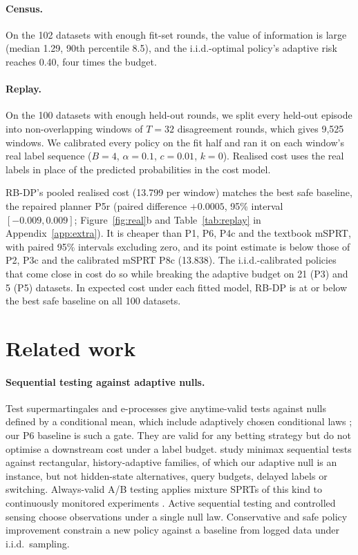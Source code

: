 \documentclass{article}
\theoremstyle{plain}
\theoremstyle{definition}
\theoremstyle{remark}
\begin{document}
\paragraph{Census.} On the 102 datasets with enough fit-set rounds, the value of information is large (median 1.29, 90th percentile 8.5), and the i.i.d.-optimal policy's adaptive risk reaches 0.40, four times the budget.

\paragraph{Replay.} On the 100 datasets with enough held-out rounds, we split every held-out episode into non-overlapping windows of $T=32$ disagreement rounds, which gives 9{,}525 windows. We calibrated every policy on the fit half and ran it on each window's real label sequence ($B=4$, $\alpha=0.1$, $c=0.01$, $k=0$). Realised cost uses the real labels in place of the predicted probabilities in the cost model.


RB-DP's pooled realised cost (13.799 per window) matches the best safe baseline, the repaired planner P5r (paired difference $+0.0005$, 95\% interval $[-0.009,0.009]$; Figure~\ref{fig:real}b and Table~\ref{tab:replay} in Appendix~\ref{app:extra}). It is cheaper than P1, P6, P4c and the textbook mSPRT, with paired 95\% intervals excluding zero, and its point estimate is below those of P2, P3c and the calibrated mSPRT P8c (13.838). The i.i.d.-calibrated policies that come close in cost do so while breaking the adaptive budget on 21 (P3) and 5 (P5) datasets. In expected cost under each fitted model, RB-DP is at or below the best safe baseline on all 100 datasets.


\section{Related work}
\label{sec:related}

\paragraph{Sequential testing against adaptive nulls.} Test supermartingales and e-processes give anytime-valid tests against nulls defined by a conditional mean, which include adaptively chosen conditional laws \citep{ramdas2023gametheoretic,waudbysmith2024betting,howard2021timeuniform,ville1939etude}; our P6 baseline is such a gate. They are valid for any betting strategy but do not optimise a downstream cost under a label budget. \citet{fauss2020minimax} study minimax sequential tests against rectangular, history-adaptive families, of which our adaptive null is an instance, but not hidden-state alternatives, query budgets, delayed labels or switching. Always-valid A/B testing applies mixture SPRTs of this kind to continuously monitored experiments \citep{johari2022always}. Active sequential testing \citep{naghshvar2013active} and controlled sensing \citep{nitinawarat2013controlled} choose observations under a single null law. Conservative and safe policy improvement \citep{wu2016conservative,thomas2015high} constrain a new policy against a baseline from logged data under i.i.d.\ sampling.
\end{document}

